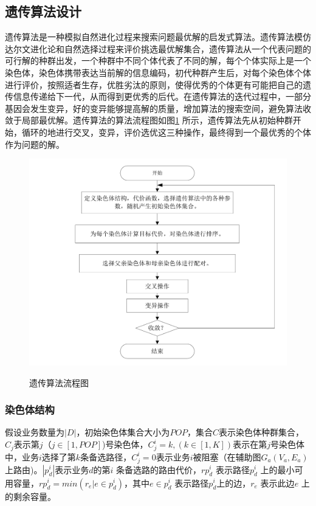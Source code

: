 \subsection{遗传算法设计}
遗传算法是一种模拟自然进化过程来搜索问题最优解的启发式算法。遗传算法模仿达尔文进化论和自然选择过程来评价挑选最优解集合，遗传算法从一个代表问题的可行解的种群出发，一个种群中不同个体代表了不同的解，每个个体实际上是一个染色体，染色体携带表达当前解的信息编码，初代种群产生后，对每个染色体个体进行评价，按照适者生存，优胜劣汰的原则，使得优秀的个体更有可能把自己的遗传信息传递给下一代，从而得到更优秀的后代。在遗传算法的迭代过程中，一部分基因会发生变异，好的变异能够提高解的质量，增加算法的搜索空间，避免算法收敛于局部最优解。遗传算法的算法流程图如图\ref{IterNum} 所示，遗传算法先从初始种群开始，循环的地进行交叉，变异，评价选优这三种操作，最终得到一个最优秀的个体作为问题的解。
\begin{figure}
\setlength{\abovecaptionskip}{-0.5cm}
\begin{center}
{\includegraphics[width=0.8 \textwidth]{figures/GAprocess.pdf}}
\end{center}
\caption{{\footnotesize{遗传算法流程图}}}
\label{IterNum}
\end{figure}
\subsubsection{染色体结构}

假设业务数量为$|D|$，初始染色体集合大小为$POP$，集合$C$表示染色体种群集合，$C_j$表示第$j$（$j \in [1,POP]$)号染色体，$C^i_j=k,(k \in [1,K])$表示在第$j$号染色体中，业务$i$选择了第$k$条备选路径，$C^i_j=0$表示业务$i$被阻塞（在辅助图$G_a(V_a,E_a)$上路由)。$|p^i_d|$表示业务$d$的第$i$ 条备选路的路由代价，$rp^i_d$ 表示路径$p^i_d$ 上的最小可用容量，$rp^i_d=min(r_e|e \in p^i_d)$，其中$e \in p^i_d$ 表示路径$p^i_d$上的边，$r_e$ 表示此边$e$ 上的剩余容量。
